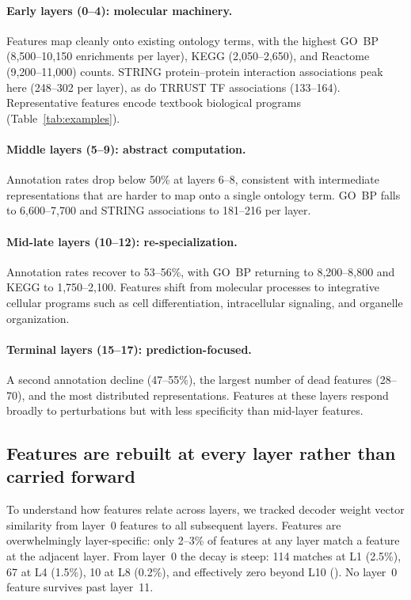 \paragraph{Early layers (0--4): molecular machinery.} Features map cleanly onto existing ontology
terms, with the highest GO~BP (8,500--10,150 enrichments per layer), KEGG (2,050--2,650), and
Reactome (9,200--11,000) counts. STRING protein--protein interaction associations peak here
(248--302 per layer), as do TRRUST TF associations (133--164). Representative features encode
textbook biological programs (Table~\ref{tab:examples}).

\paragraph{Middle layers (5--9): abstract computation.} Annotation rates drop below 50\% at layers
6--8, consistent with intermediate representations that are harder to map onto a single ontology
term. GO~BP falls to 6,600--7,700 and STRING associations to 181--216 per layer.

\paragraph{Mid-late layers (10--12): re-specialization.} Annotation rates recover to 53--56\%, with
GO~BP returning to 8,200--8,800 and KEGG to 1,750--2,100. Features shift from molecular processes
to integrative cellular programs such as cell differentiation, intracellular signaling, and
organelle organization.

\paragraph{Terminal layers (15--17): prediction-focused.} A second annotation decline (47--55\%),
the largest number of dead features (28--70), and the most distributed representations. Features at
these layers respond broadly to perturbations but with less specificity than mid-layer features.

\subsection*{Features are rebuilt at every layer rather than carried forward}
\label{sec:crosslayer}

To understand how features relate across layers, we tracked decoder weight vector similarity from
layer~0 features to all subsequent layers. Features are overwhelmingly layer-specific: only 2--3\%
of features at any layer match a feature at the adjacent layer. From layer~0 the decay is steep:
114 matches at L1 (2.5\%), 67 at L4 (1.5\%), 10 at L8 (0.2\%), and effectively zero beyond L10
(). No
layer~0 feature survives past layer~11.

